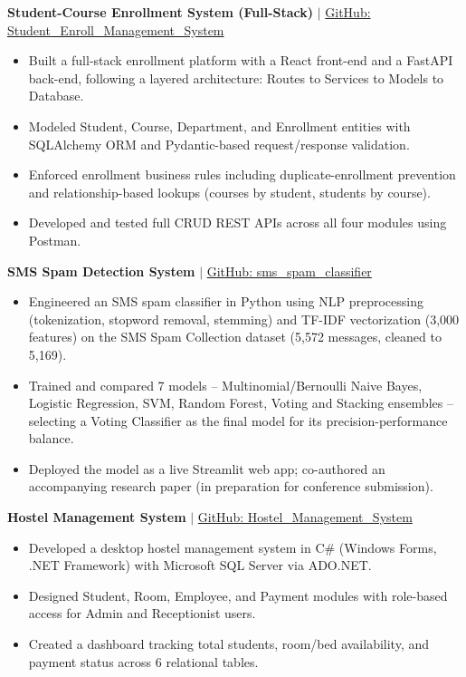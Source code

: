 \documentclass[9.5pt,a4paper]{article}
\begin{document}
\textbf{Student-Course Enrollment System (Full-Stack)} \quad $|$ \quad \href{https://github.com/Kazi-Sadman/Student_Enroll_Management_System}{GitHub: Student\_Enroll\_Management\_System}
\begin{itemize}
    \item Built a full-stack enrollment platform with a React front-end and a FastAPI back-end, following a layered architecture: Routes to Services to Models to Database.
    \item Modeled Student, Course, Department, and Enrollment entities with SQLAlchemy ORM and Pydantic-based request/response validation.
    \item Enforced enrollment business rules including duplicate-enrollment prevention and relationship-based lookups (courses by student, students by course).
    \item Developed and tested full CRUD REST APIs across all four modules using Postman.
\end{itemize}

\textbf{SMS Spam Detection System} \quad $|$ \quad \href{https://github.com/Kazi-Sadman/sms_spam_classifier}{GitHub: sms\_spam\_classifier}
\begin{itemize}
    \item Engineered an SMS spam classifier in Python using NLP preprocessing (tokenization, stopword removal, stemming) and TF-IDF vectorization (3,000 features) on the SMS Spam Collection dataset (5,572 messages, cleaned to 5,169).
    \item Trained and compared 7 models -- Multinomial/Bernoulli Naive Bayes, Logistic Regression, SVM, Random Forest, Voting and Stacking ensembles -- selecting a Voting Classifier as the final model for its precision-performance balance.
    \item Deployed the model as a live Streamlit web app; co-authored an accompanying research paper (in preparation for conference submission).
\end{itemize}

\textbf{Hostel Management System} \quad $|$ \quad \href{https://github.com/Kazi-Sadman/Hostel_Management_System}{GitHub: Hostel\_Management\_System}
\begin{itemize}
    \item Developed a desktop hostel management system in C\# (Windows Forms, .NET Framework) with Microsoft SQL Server via ADO.NET.
    \item Designed Student, Room, Employee, and Payment modules with role-based access for Admin and Receptionist users.
    \item Created a dashboard tracking total students, room/bed availability, and payment status across 6 relational tables.
\end{itemize}
\end{document}
